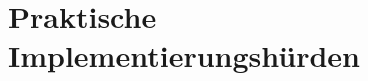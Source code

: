\label{subsubsec:mild_nebenwirkungen}

\label{subsubsec:severe_complications}

\label{subsubsec:pharm_vs_stim}

\section{Praktische Implementierungshürden}
\label{sec:hürden}


\label{subsec:personalisierung}


